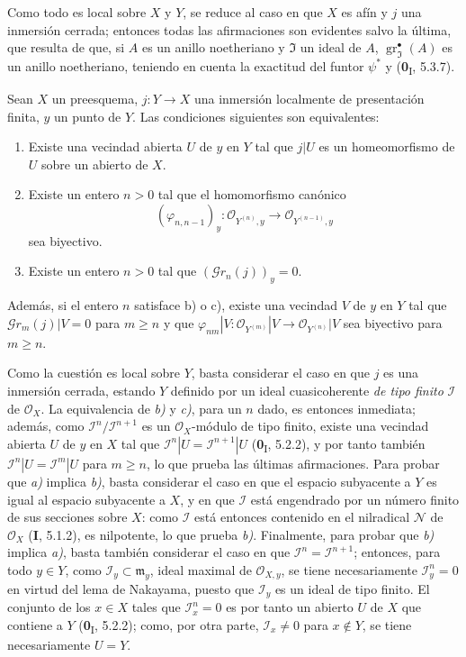 Como todo es local sobre $X$ y $Y$, se reduce al caso en que $X$ es afín y $j$
una inmersión cerrada; entonces todas las afirmaciones son evidentes salvo la
última, que resulta de que, si $A$ es un anillo noetheriano y
$\mathfrak{I}$ un ideal de $A$, $\operatorname{gr}_{\mathfrak{I}}^\bullet(A)$
es un anillo noetheriano, teniendo en cuenta la exactitud del funtor $\psi^*$ y
(\textbf{0}\textsubscript{I}, 5.3.7).

\begin{proposition}[16.1.9]
\label{IV.16.1.9}
Sean $X$ un preesquema, $j:Y\to X$ una inmersión localmente de presentación
finita, $y$ un punto de $Y$. Las condiciones siguientes son equivalentes:
\begin{enumerate}
\item[\textup{a)}] Existe una vecindad abierta $U$ de $y$ en $Y$ tal que $j|U$ es
un homeomorfismo de $U$ sobre un abierto de $X$.
\item[\textup{b)}] Existe un entero $n>0$ tal que el homomorfismo canónico
\[
  (\varphi_{n,n-1})_y:
  \mathcal{O}_{Y^{(n)},y}\longrightarrow\mathcal{O}_{Y^{(n-1)},y}
\]
sea biyectivo.
\item[\textup{c)}] Existe un entero $n>0$ tal que
$(\mathscr{G}r_n(j))_y=0$.
\end{enumerate}
Además, si el entero $n$ satisface \textup{b)} o \textup{c)}, existe una vecindad $V$ de $y$
en $Y$ tal que $\mathscr{G}r_m(j)|V=0$ para $m\geq n$ y que
$\varphi_{nm}|V:\mathcal{O}_{Y^{(m)}}|V\to\mathcal{O}_{Y^{(n)}}|V$ sea
biyectivo para $m\geq n$.
\end{proposition}

Como la cuestión es local sobre $Y$, basta considerar el caso en que $j$ es una
inmersión cerrada, estando $Y$ definido por un ideal cuasicoherente \emph{de tipo finito}
$\mathscr{I}$ de $\mathcal{O}_X$. La equivalencia de \emph{b)} y \emph{c)}, para un $n$ dado,
es entonces inmediata; además, como
$\mathscr{I}^n/\mathscr{I}^{n+1}$ es un $\mathcal{O}_X$-módulo de tipo finito,
existe una vecindad abierta $U$ de $y$ en $X$ tal que
$\mathscr{I}^n|U=\mathscr{I}^{n+1}|U$ (\textbf 0\textsubscript{I}, 5.2.2), y por tanto también
$\mathscr{I}^n|U=\mathscr{I}^m|U$ para $m\geq n$, lo que prueba las últimas
afirmaciones. Para probar que \emph{a)} implica \emph{b)}, basta considerar el caso en que
el espacio subyacente a $Y$ es igual al espacio subyacente a $X$, y en que
$\mathscr{I}$ está engendrado por un número finito de sus secciones sobre $X$:
como $\mathscr{I}$ está entonces contenido en el nilradical $\mathscr{N}$ de
$\mathcal{O}_X$ (\textbf I, 5.1.2), es nilpotente, lo que prueba \emph{b)}. Finalmente, para
probar que \emph{b)} implica \emph{a)}, basta también considerar el caso en que
$\mathscr{I}^n=\mathscr{I}^{n+1}$; entonces, para todo $y\in Y$, como
$\mathscr{I}_y\subset\mathfrak{m}_y$, ideal maximal de
$\mathcal{O}_{X,y}$, se tiene necesariamente $\mathscr{I}_y^n=0$ en virtud del
lema de Nakayama, puesto que $\mathscr{I}_y$ es un ideal de tipo finito.
El conjunto de los $x\in X$ tales que $\mathscr{I}_x^n=0$ es por tanto un abierto $U$ de
$X$ que contiene a $Y$ (\textbf 0\textsubscript{I}, 5.2.2); como, por otra parte,
$\mathscr{I}_x\neq 0$ para $x\notin Y$, se tiene necesariamente $U=Y$.

